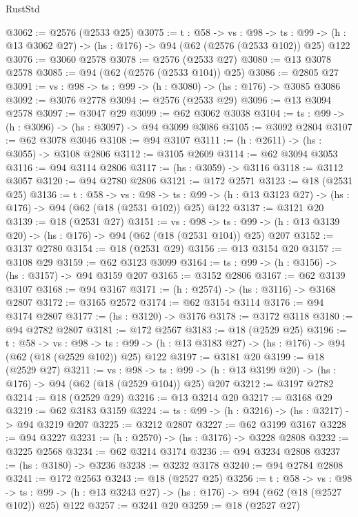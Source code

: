 \begin{lexlean}{RustStd}
\begin{coremodule}
{\begin{coremodule}
{{{{{{{{{{{@3062 := @2576 (@2533 @25)
@3075 := {t : @58} ->
  {vs : @98} ->
  {ts : @99} -> (h : @13 @3062 @27) -> (hs : @176) -> @94 (@62 (@2576 (@2533 @102)) @25) @122
@3076 := @3060 @2578
@3078 := @2576 (@2533 @27)
@3080 := @13 @3078 @2578
@3085 := @94 (@62 (@2576 (@2533 @104)) @25)
@3086 := @2805 @27
@3091 := {vs : @98} -> {ts : @99} -> (h : @3080) -> (hs : @176) -> @3085 @3086
@3092 := @3076 @2778
@3094 := @2576 (@2533 @29)
@3096 := @13 @3094 @2578
@3097 := @3047 @29
@3099 := @62 @3062 @3038
@3104 := {ts : @99} -> (h : @3096) -> (hs : @3097) -> @94 @3099 @3086
@3105 := @3092 @2804
@3107 := @62 @3078 @3046
@3108 := @94 @3107
@3111 := (h : @2611) -> (hs : @3055) -> @3108 @2806
@3112 := @3105 @2609
@3114 := @62 @3094 @3053
@3116 := @94 @3114 @2806
@3117 := (hs : @3059) -> @3116
@3118 := @3112 @3057
@3120 := @94 @2780 @2806
@3121 := @172 @2571
@3123 := @18 (@2531 @25)
@3136 := {t : @58} ->
  {vs : @98} ->
  {ts : @99} -> (h : @13 @3123 @27) -> (hs : @176) -> @94 (@62 (@18 (@2531 @102)) @25) @122
@3137 := @3121 @20
@3139 := @18 (@2531 @27)
@3151 := {vs : @98} ->
  {ts : @99} -> (h : @13 @3139 @20) -> (hs : @176) -> @94 (@62 (@18 (@2531 @104)) @25) @207
@3152 := @3137 @2780
@3154 := @18 (@2531 @29)
@3156 := @13 @3154 @20
@3157 := @3108 @29
@3159 := @62 @3123 @3099
@3164 := {ts : @99} -> (h : @3156) -> (hs : @3157) -> @94 @3159 @207
@3165 := @3152 @2806
@3167 := @62 @3139 @3107
@3168 := @94 @3167
@3171 := (h : @2574) -> (hs : @3116) -> @3168 @2807
@3172 := @3165 @2572
@3174 := @62 @3154 @3114
@3176 := @94 @3174 @2807
@3177 := (hs : @3120) -> @3176
@3178 := @3172 @3118
@3180 := @94 @2782 @2807
@3181 := @172 @2567
@3183 := @18 (@2529 @25)
@3196 := {t : @58} ->
  {vs : @98} ->
  {ts : @99} -> (h : @13 @3183 @27) -> (hs : @176) -> @94 (@62 (@18 (@2529 @102)) @25) @122
@3197 := @3181 @20
@3199 := @18 (@2529 @27)
@3211 := {vs : @98} ->
  {ts : @99} -> (h : @13 @3199 @20) -> (hs : @176) -> @94 (@62 (@18 (@2529 @104)) @25) @207
@3212 := @3197 @2782
@3214 := @18 (@2529 @29)
@3216 := @13 @3214 @20
@3217 := @3168 @29
@3219 := @62 @3183 @3159
@3224 := {ts : @99} -> (h : @3216) -> (hs : @3217) -> @94 @3219 @207
@3225 := @3212 @2807
@3227 := @62 @3199 @3167
@3228 := @94 @3227
@3231 := (h : @2570) -> (hs : @3176) -> @3228 @2808
@3232 := @3225 @2568
@3234 := @62 @3214 @3174
@3236 := @94 @3234 @2808
@3237 := (hs : @3180) -> @3236
@3238 := @3232 @3178
@3240 := @94 @2784 @2808
@3241 := @172 @2563
@3243 := @18 (@2527 @25)
@3256 := {t : @58} ->
  {vs : @98} ->
  {ts : @99} -> (h : @13 @3243 @27) -> (hs : @176) -> @94 (@62 (@18 (@2527 @102)) @25) @122
@3257 := @3241 @20
@3259 := @18 (@2527 @27)
}}}}}}}}}}}
\end{coremodule}}
\end{coremodule}
\end{lexlean}
